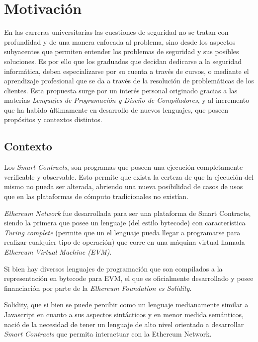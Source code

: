 \section{Motivación}
En las carreras universitarias las cuestiones de seguridad no se tratan con profundidad y de una manera enfocada al problema, sino desde los aspectos subyacentes que permiten entender los problemas de seguridad y sus posibles soluciones.  Es por ello que los graduados que decidan dedicarse a la seguridad informática, deben especializarse por su cuenta a través de cursos, o mediante el aprendizaje profesional que se da a través de la resolución de problemáticas de los clientes. 
Esta propuesta surge por un interés personal originado gracias a las materias \textit{Lenguajes de Programación y Diseño de Compiladores}, y al incremento que ha habido últimamente en desarrollo de nuevos lenguajes, que poseen propósitos y contextos distintos\cite{Klabnik:2018:RPL:3271463}\cite{Forsgren:2018:ASL:3235404}.

\subsection{Contexto}
Los \textit{Smart Contracts}, son programas que poseen una ejecución completamente verificable y observable. Esto permite que exista la certeza de que la ejecución del mismo no pueda ser alterada, abriendo una nueva posibilidad de casos de usos que en las plataformas de cómputo tradicionales no existían.

\textit{Ethereum Network} fue desarrollada para ser una plataforma de Smart Contracts, siendo la primera que posee un lenguaje (del estilo bytecode) con característica \textit{Turing complete} (permite que un el lenguaje pueda llegar a programarse para realizar cualquier tipo de operación) que corre en una máquina virtual llamada \textit{Ethereum Virtual Machine (EVM)}.

Si bien hay diversos lenguajes de programación que son compilados a la representación en bytecode para EVM, el que es oficialmente desarrollado y posee financiación por parte de la \textit{Ethereum Foundation es Solidity}\cite{solidity_readthedocs}.

Solidity, que si bien se puede percibir como un lenguaje medianamente similar a Javascript en cuanto a sus aspectos sintácticos y en menor medida semánticos, nació de la necesidad de tener un lenguaje de alto nivel orientado a desarrollar \textit{Smart Contracts} que permita interactuar con la Ethereum Network. 

